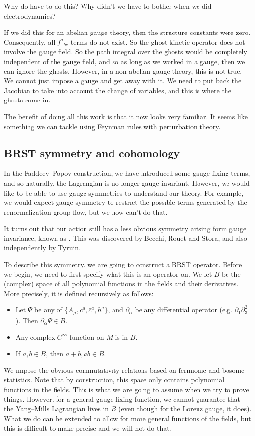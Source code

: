 \documentclass[a4paper]{article}
\begin{document}
Why do have to do this? Why didn't we have to bother when we did electrodynamics?

If we did this for an abelian gauge theory, then the structure constants were zero. Consequently, all $f^a\!_{bc}$ terms do not exist. So the ghost kinetic operator does not involve the gauge field. So the path integral over the ghosts would be completely independent of the gauge field, and so as long as we worked in a gauge, then we can ignore the ghosts. However, in a non-abelian gauge theory, this is not true. We cannot just impose a gauge and get away with it. We need to put back the Jacobian to take into account the change of variables, and this is where the ghosts come in.

The benefit of doing all this work is that it now looks very familiar. It seems like something we can tackle using Feynman rules with perturbation theory.

\subsection{BRST symmetry and cohomology}
In the Faddeev--Popov construction, we have introduced some gauge-fixing terms, and so naturally, the Lagrangian is no longer gauge invariant. However, we would like to be able to use gauge symmetries to understand our theory. For example, we would expect gauge symmetry to restrict the possible terms generated by the renormalization group flow, but we now can't do that.

It turns out that our action still has a less obvious symmetry arising form gauge invariance, known as . This was discovered by Becchi, Rouet and Stora, and also independently by Tyruin.

To describe this symmetry, we are going to construct a BRST operator. Before we begin, we need to first specify what this is an operator on. We let $B$ be the (complex) space of all polynomial functions in the fields and their derivatives. More precisely, it is defined recursively as follows:
\begin{itemize}
  \item Let $\Psi$ be any of $\{A_\mu, c^a, \bar{c}^a, h^a\}$, and $\partial_\alpha$ be any differential operator (e.g. $\partial_1 \partial_3^2$). Then $\partial_\alpha \Psi \in B$.
  \item Any complex $C^\infty$ function on $M$ is in $B$.
  \item If $a, b \in B$, then $a + b, ab \in B$.
\end{itemize}
We impose the obvious commutativity relations based on fermionic and bosonic statistics. Note that by construction, this space only contains polynomial functions in the fields. This is what we are going to assume when we try to prove things. However, for a general gauge-fixing function, we cannot guarantee that the Yang--Mills Lagrangian lives in $B$ (even though for the Lorenz gauge, it does). What we do can be extended to allow for more general functions of the fields, but this is difficult to make precise and we will not do that.
\end{document}
